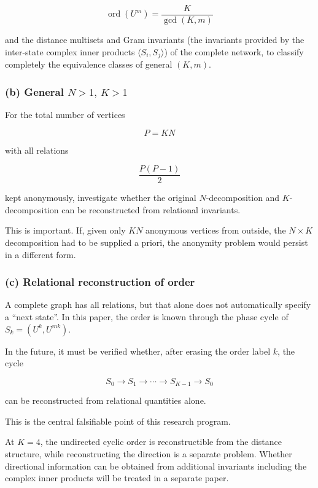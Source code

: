 \documentclass[
  a4paper,
]{article}
\begin{document}
\[
\operatorname{ord}(U^m)=\frac{K}{\gcd(K,m)}
\]

and the distance multisets and Gram invariants (the invariants provided
by the inter-state complex inner products \(\langle S_i,S_j\rangle\)) of
the complete network, to classify completely the equivalence classes of
general \((K,m)\).

\subsubsection{\texorpdfstring{(b) General
\(N>1,\ K>1\)}{(b) General N\textgreater1,\textbackslash{} K\textgreater1}}\label{b-general-n1-k1}

For the total number of vertices

\[
P=KN
\]

with all relations

\[
\frac{P(P-1)}2
\]

kept anonymously, investigate whether the original \(N\)-decomposition
and \(K\)-decomposition can be reconstructed from relational invariants.

This is important. If, given only \(KN\) anonymous vertices from
outside, the \(N\times K\) decomposition had to be supplied a priori,
the anonymity problem would persist in a different form.

\subsubsection{(c) Relational reconstruction of
order}\label{c-relational-reconstruction-of-order}

A complete graph has all relations, but that alone does not
automatically specify a ``next state''. In this paper, the order is
known through the phase cycle of \(S_k=(U^k,U^{mk})\).

In the future, it must be verified whether, after erasing the order
label \(k\), the cycle

\[
S_0\to S_1\to\cdots\to S_{K-1}\to S_0
\]

can be reconstructed from relational quantities alone.

This is the central falsifiable point of this research program.

At \(K=4\), the undirected cyclic order is reconstructible from the
distance structure, while reconstructing the direction is a separate
problem. Whether directional information can be obtained from additional
invariants including the complex inner products will be treated in a
separate paper.
\end{document}

